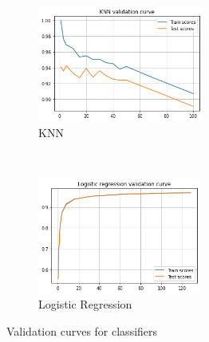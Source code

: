 \documentclass{article}
\begin{document}
\begin{figure}[htb!]
    \begin{subfigure}[t]{0.5\textwidth}
        \centering
        \includegraphics[height=1.5in]{img/momentum-classification/validation-curves/knn}
        \caption{KNN}
    \end{subfigure}%
    ~
    \begin{subfigure}[t]{0.5\textwidth}
        \centering
        \includegraphics[height=1.5in]{img/momentum-classification/validation-curves/log-regression}
        \caption{Logistic Regression}
    \end{subfigure}

    \caption{Validation curves for classifiers}
\end{figure}
\end{document}
